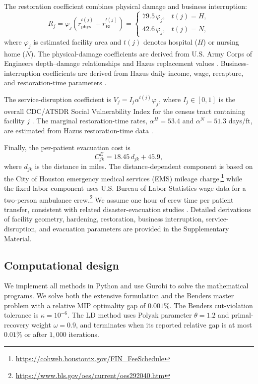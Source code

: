 \documentclass[preprint,11pt,authoryear]{elsarticle}
\begin{document}
The restoration coefficient combines physical damage and business
interruption:
\begin{equation*}
R_j
=
\varphi_j
\left(
r_{\mathrm{phys}}^{t(j)}
+
r_{\mathrm{BI}}^{t(j)}
\right)
=
\begin{cases}
79.5\,\varphi_j, & t(j)=H,\\
42.6\,\varphi_j, & t(j)=N,
\end{cases}
\end{equation*}
where $\varphi_j$ is estimated facility area and $t(j)$ denotes hospital
($H$) or nursing home ($N$). The physical-damage coefficients are derived
from U.S. Army Corps of Engineers depth--damage relationships and Hazus
replacement values
\citep{naccs_depth_damage,hazus_inventory_tm}. Business-interruption
coefficients are derived from Hazus daily income, wage, recapture, and
restoration-time parameters \citep{hazus_flood_tm}.

The service-disruption coefficient is
$V_j=I_j\alpha^{t(j)}\varphi_j$,
where $I_j\in[0,1]$ is the overall CDC/ATSDR Social Vulnerability Index for
the census tract containing facility $j$
\citep{cdc_svi,flanagan_social_2011}. The marginal restoration-time rates,
$\alpha^H=53.4$ and $\alpha^N=51.3$ days/ft, are estimated from Hazus
restoration-time data \citep{hazus_flood_tm}.

Finally, the per-patient evacuation cost is
\begin{equation*}
C_{jk}^E
=
18.45\,d_{jk}+45.9,
\end{equation*}
where $d_{jk}$ is the distance in miles. The distance-dependent component is
based on the City of Houston emergency medical services (EMS) mileage charge,\footnote{\url{https://cohweb.houstontx.gov/FIN_FeeSchedule}}
while the fixed labor component uses U.S. Bureau of Labor Statistics wage
data for a two-person ambulance crew.\footnote{\url{https://www.bls.gov/oes/current/oes292040.htm}}
We assume one hour of crew time per patient transfer, consistent with related
disaster-evacuation studies \citep{KIM2024104518}. Detailed derivations of
facility geometry, hardening, restoration, business interruption,
service-disruption, and evacuation parameters are provided in the
Supplementary Material.

\subsection{Computational design}
\label{sec:comp_setup}
We implement all methods in Python and use Gurobi to solve the mathematical
programs. We solve both the extensive formulation and the Benders master problem with a relative MIP optimality gap of $0.001\%$. The Benders cut-violation tolerance is
$\kappa=10^{-6}$. The LD method uses Polyak parameter $\theta=1.2$ and
primal-recovery weight $\omega=0.9$, and terminates when its reported
relative gap is at most $0.01\%$ or after $1{,}000$ iterations.
\end{document}
